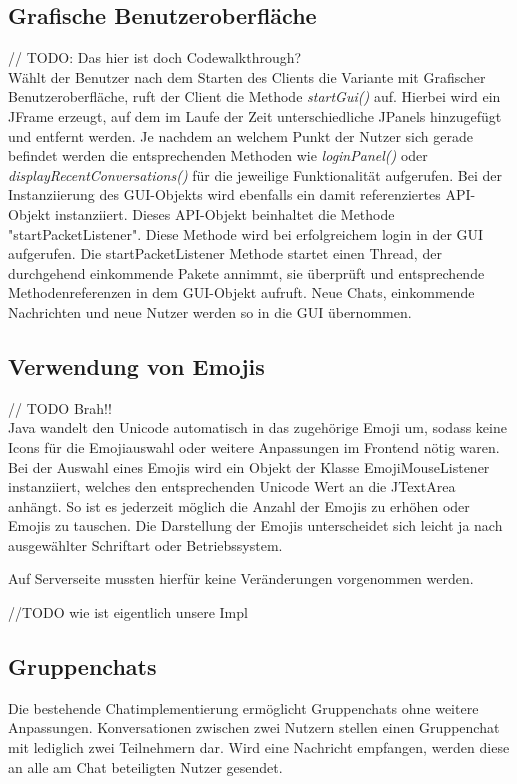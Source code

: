 
\author{Jan Grübener, Patrick Mischka}
\subsection{Grafische Benutzeroberfläche}
// TODO: Das hier ist doch Codewalkthrough?\\
Wählt der Benutzer nach dem Starten des Clients die Variante mit Grafischer Benutzeroberfläche, 
ruft der Client die Methode \textit{startGui()} auf. Hierbei wird ein JFrame erzeugt, auf dem im Laufe der Zeit unterschiedliche JPanels
hinzugefügt und entfernt werden. Je nachdem an welchem Punkt der Nutzer sich gerade befindet werden die entsprechenden 
Methoden wie \textit{loginPanel()} oder \textit{displayRecentConversations()} für die jeweilige Funktionalität aufgerufen.
Bei der Instanziierung des GUI-Objekts wird ebenfalls ein damit referenziertes API-Objekt instanziiert. 
Dieses API-Objekt beinhaltet die Methode "startPacketListener". Diese Methode wird bei erfolgreichem login in der GUI aufgerufen. 
Die startPacketListener Methode startet einen Thread, der durchgehend einkommende Pakete annimmt, 
sie überprüft und entsprechende Methodenreferenzen in dem GUI-Objekt aufruft. 
Neue Chats, einkommende Nachrichten und neue Nutzer werden so in die GUI übernommen.

\author{Jan Grübener, Patrick Mischka}
\subsection{Verwendung von Emojis}
// TODO Brah!! \\
Java wandelt den Unicode automatisch in das zugehörige Emoji um, sodass keine Icons für die Emojiauswahl 
oder weitere Anpassungen im Frontend nötig waren. Bei der Auswahl eines Emojis wird ein Objekt der Klasse EmojiMouseListener 
instanziiert, welches den entsprechenden Unicode Wert an die JTextArea anhängt. 
So ist es jederzeit möglich die Anzahl der Emojis zu erhöhen oder Emojis zu tauschen. 
Die Darstellung der Emojis unterscheidet sich leicht ja nach ausgewählter Schriftart oder Betriebssystem. 

Auf Serverseite mussten hierfür keine Veränderungen vorgenommen werden.

//TODO wie ist eigentlich unsere Impl
\author{Matthias Vonend, Aaron Schweig, Troy Keßler}
\subsection{Gruppenchats}
Die bestehende Chatimplementierung ermöglicht Gruppenchats ohne weitere Anpassungen. Konversationen zwischen zwei Nutzern stellen einen Gruppenchat mit lediglich zwei Teilnehmern dar.
Wird eine Nachricht empfangen, werden diese an alle am Chat beteiligten Nutzer gesendet.

